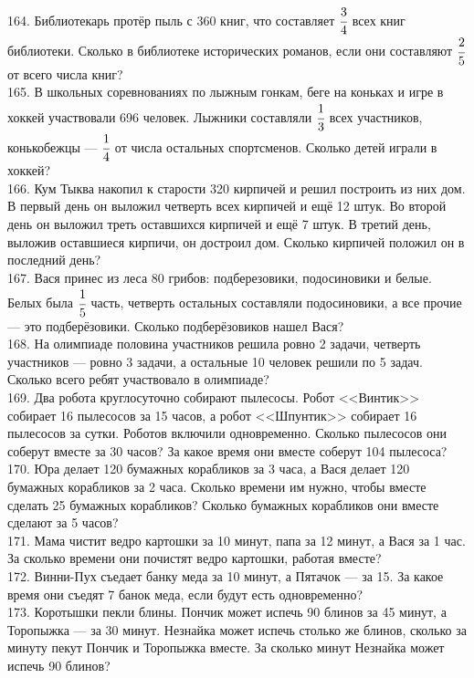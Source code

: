 164. Библиотекарь протёр пыль с 360 книг, что составляет $\cfrac{3}{4}$ всех книг библиотеки. Сколько в библиотеке исторических романов, если они составляют $\cfrac{2}{5}$ от всего числа книг?\\
165. В школьных соревнованиях по лыжным гонкам, беге на коньках и игре в хоккей участвовали 696 человек. Лыжники составляли $\cfrac{1}{3}$ всех участников, конькобежцы --- $\cfrac{1}{4}$ от числа остальных спортсменов. Сколько детей играли в хоккей?\\
166. Кум Тыква накопил к старости 320 кирпичей и решил построить из них дом. В первый день он выложил четверть всех кирпичей и ещё 12 штук. Во второй день он выложил треть оставшихся кирпичей и ещё 7 штук. В третий день, выложив оставшиеся кирпичи, он достроил дом. Сколько кирпичей положил он в последний день?\\
167. Вася принес из леса 80 грибов: подберезовики, подосиновики и белые. Белых была $\cfrac{1}{5}$ часть, четверть остальных составляли подосиновики, а все прочие --- это подберёзовики. Сколько подберёзовиков нашел Вася?\\
168. На олимпиаде половина участников решила ровно 2 задачи, четверть участников --- ровно 3 задачи, а остальные 10 человек решили по 5 задач. Сколько всего ребят участвовало в олимпиаде?\\
169. Два робота круглосуточно собирают пылесосы. Робот <<Винтик>> собирает 16 пылесосов за 15 часов, а робот <<Шпунтик>> собирает 16 пылесосов за сутки. Роботов включили одновременно. Сколько пылесосов они соберут вместе за 30 часов? За какое время они вместе соберут 104 пылесоса?\\
170. Юра делает 120 бумажных корабликов за 3 часа, а Вася делает 120 бумажных корабликов за 2 часа. Сколько времени им нужно, чтобы вместе сделать 25 бумажных корабликов? Сколько бумажных корабликов они вместе сделают за 5 часов?\\
171. Мама чистит ведро картошки за 10 минут, папа за 12 минут, а Вася за 1 час. За сколько времени они почистят ведро картошки, работая вместе?\\
172. Винни-Пух съедает банку меда за 10 минут, а Пятачок --- за 15. За какое время они съедят 7 банок меда, если будут есть одновременно?\\
173. Коротышки пекли блины. Пончик может испечь 90 блинов за 45 минут, а Торопыжка --- за 30 минут. Незнайка может испечь столько же блинов, сколько за минуту пекут Пончик и Торопыжка вместе. За сколько минут Незнайка может испечь 90 блинов?\\
